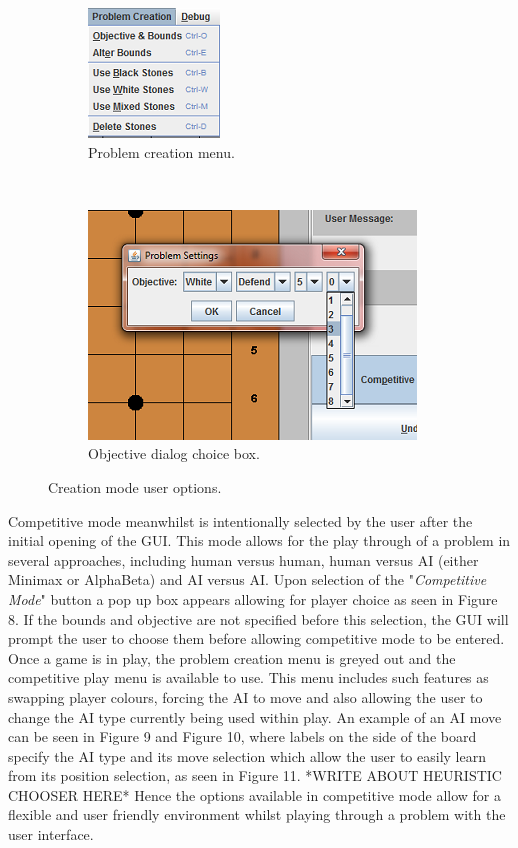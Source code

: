\documentclass{l3proj}
\begin{document}
\begin{figure}[H]
\begin{subfigure}[H]{0.2\textwidth}
\includegraphics[scale=1]{Images/GUI-6-PCMenu.png}
\caption{Problem creation menu.}
\end{subfigure}
~~~~~~~~~~~~~~~~~~~~~~~~~~~
\begin{subfigure}[H]{0.3\textwidth}
\includegraphics[scale=1]{Images/GUI-7-Objective.png}
\caption{Objective dialog choice box.}
\end{subfigure}
\caption{Creation mode user options.}
\end{figure}

Competitive mode meanwhilst is intentionally selected by the user after the initial opening of the GUI. This mode allows for the play through of a problem in several approaches, including human versus human, human versus AI (either Minimax or AlphaBeta) and AI versus AI. Upon selection of the "\textit{Competitive Mode}" button a pop up box appears allowing for player choice as seen in Figure 8. If the bounds and objective are not specified before this selection, the GUI will prompt the user to choose them before allowing competitive mode to be entered. Once a game is in play, the problem creation menu is greyed out and the competitive play menu is available to use. This menu includes such features as swapping player colours, forcing the AI to move and also allowing the user to change the AI type currently being used within play. An example of an AI move can be seen in Figure 9 and Figure 10, where labels on the side of the board specify the AI type and its move selection which allow the user to easily learn from its position selection, as seen in Figure 11. *WRITE ABOUT HEURISTIC CHOOSER HERE* Hence the options available in competitive mode allow for a flexible and user friendly environment whilst playing through a problem with the user interface.
\end{document}
